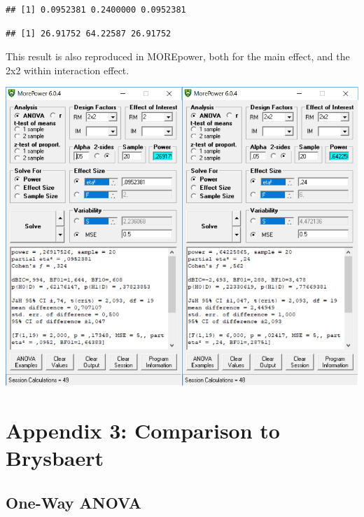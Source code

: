 \documentclass[
]{book}
\newenvironment{Shaded}{\begin{snugshade}}{\end{snugshade}}
\newcommand{\NormalTok}[1]{#1}
\newcommand{\OperatorTok}[1]{\textcolor[rgb]{0.81,0.36,0.00}{\textbf{#1}}}
\begin{document}
\begin{verbatim}
## [1] 0.0952381 0.2400000 0.0952381
\end{verbatim}

\begin{Shaded}
\end{Shaded}

\begin{verbatim}
## [1] 26.91752 64.22587 26.91752
\end{verbatim}

This result is also reproduced in MOREpower, both for the main effect, and the 2x2 within interaction effect.

\includegraphics{screenshots/morepower_6.png}

\hypertarget{appendix-3-comparison-to-brysbaert}{%
\chapter*{Appendix 3: Comparison to Brysbaert}\label{appendix-3-comparison-to-brysbaert}}

\hypertarget{one-way-anova-1}{%
\section{One-Way ANOVA}\label{one-way-anova-1}}
\end{document}
